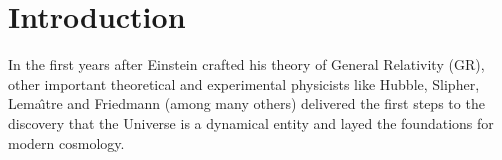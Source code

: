 \chapter*{Introduction \label{IntroIntro}} %





In the first years after Einstein crafted his theory of General Relativity (GR), other important theoretical and experimental physicists like Hubble, Slipher, Lema\^{\i}tre and Friedmann 
(among many others) delivered the first steps to the discovery 
that the Universe is a dynamical entity and layed the foundations for modern cosmology.

